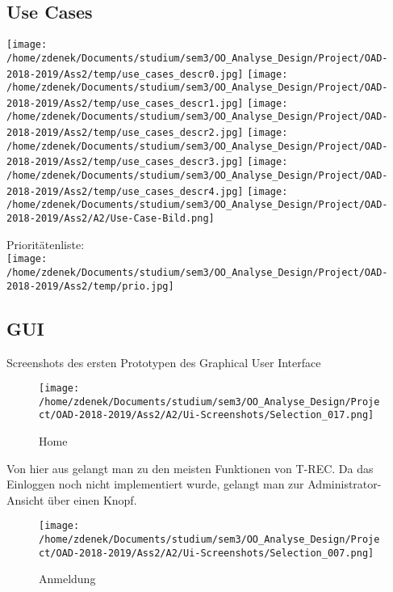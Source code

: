 \documentclass[a4paper]{article}
\begin{document}
\subsection{Use Cases}



\texttt{[image: /home/zdenek/Documents/studium/sem3/OO\_Analyse\_Design/Project/OAD-2018-2019/Ass2/temp/use\_cases\_descr0.jpg]}
\newpage
\texttt{[image: /home/zdenek/Documents/studium/sem3/OO\_Analyse\_Design/Project/OAD-2018-2019/Ass2/temp/use\_cases\_descr1.jpg]}
\newpage
\texttt{[image: /home/zdenek/Documents/studium/sem3/OO\_Analyse\_Design/Project/OAD-2018-2019/Ass2/temp/use\_cases\_descr2.jpg]}
\newpage
\texttt{[image: /home/zdenek/Documents/studium/sem3/OO\_Analyse\_Design/Project/OAD-2018-2019/Ass2/temp/use\_cases\_descr3.jpg]}
\newpage
\texttt{[image: /home/zdenek/Documents/studium/sem3/OO\_Analyse\_Design/Project/OAD-2018-2019/Ass2/temp/use\_cases\_descr4.jpg]}
\newpage
\texttt{[image: /home/zdenek/Documents/studium/sem3/OO\_Analyse\_Design/Project/OAD-2018-2019/Ass2/A2/Use-Case-Bild.png]}

Prioritätenliste: \\

\texttt{[image: /home/zdenek/Documents/studium/sem3/OO\_Analyse\_Design/Project/OAD-2018-2019/Ass2/temp/prio.jpg]}


\newpage

\subsection{GUI}

Screenshots des ersten Prototypen des Graphical User Interface

\begin{figure}[h]
\centering
\caption{Home}
\texttt{[image: /home/zdenek/Documents/studium/sem3/OO\_Analyse\_Design/Project/OAD-2018-2019/Ass2/A2/Ui-Screenshots/Selection\_017.png]}
\end{figure}

Von hier aus gelangt man zu den meisten Funktionen von T-REC.
Da das Einloggen noch nicht implementiert wurde, gelangt man zur Administrator-Ansicht über einen Knopf.


\begin{figure}[h]
\centering
\caption{Anmeldung}
\texttt{[image: /home/zdenek/Documents/studium/sem3/OO\_Analyse\_Design/Project/OAD-2018-2019/Ass2/A2/Ui-Screenshots/Selection\_007.png]}
\end{figure}
\end{document}
